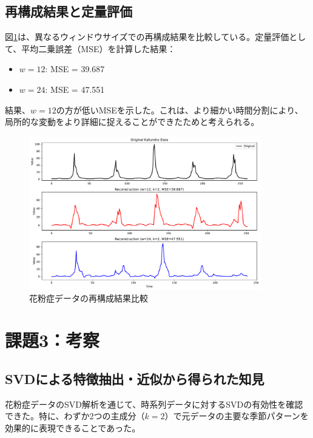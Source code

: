 \documentclass[a4paper,11pt]{jsarticle}
\begin{document}
\subsection{再構成結果と定量評価}

図\ref{fig:kafunsho-reconstruction}は、異なるウィンドウサイズでの再構成結果を比較している。定量評価として、平均二乗誤差（MSE）を計算した結果：

\begin{itemize}
\item $w=12$: MSE = 39.687
\item $w=24$: MSE = 47.551
\end{itemize}

結果、$w=12$の方が低いMSEを示した。これは、より細かい時間分割により、局所的な変動をより詳細に捉えることができたためと考えられる。

\begin{figure}[H]
\centering
\includegraphics[width=0.9\textwidth]{figures/fig6_kafunsho_reconstruction.pdf}
\caption{花粉症データの再構成結果比較}
\label{fig:kafunsho-reconstruction}
\end{figure}

\section{課題3：考察}

\subsection{SVDによる特徴抽出・近似から得られた知見}

花粉症データのSVD解析を通じて、時系列データに対するSVDの有効性を確認できた。特に、わずか2つの主成分（$k=2$）で元データの主要な季節パターンを効果的に表現できることであった。
\end{document}
